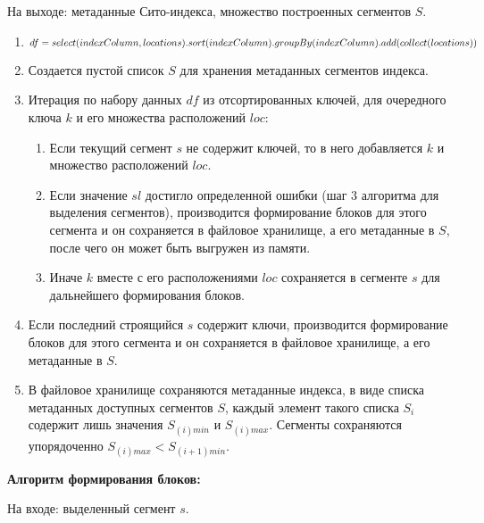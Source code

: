 На выходе: метаданные Сито-индекса, множество построенных сегментов $S$.
\begin{enumerate}
\item $df = select(indexColumn, locations).sort(indexColumn)\\.groupBy(indexColumn).add(collect(locations))$
\item Создается пустой список $S$ для хранения метаданных сегментов индекса.
\item Итерация по набору данных $df$ из отсортированных ключей, для очередного ключа $k$ и его множества расположений $loc$:
    \begin{enumerate}
    \item Если текущий сегмент $s$ не содержит ключей, то в него добавляется $k$ и множество расположений $loc$.
    \item Если значение $sl$ достигло определенной ошибки (шаг 3 алгоритма для выделения сегментов), производится формирование блоков для этого сегмента и он сохраняется в файловое хранилище, а его метаданные в $S$, после чего он может быть выгружен из памяти.
    \item Иначе $k$ вместе с его расположениями $loc$ сохраняется в сегменте $s$ для дальнейшего формирования блоков.
    \end{enumerate}
\item Если последний строящийся $s$ содержит ключи, производится формирование блоков для этого сегмента и он сохраняется в файловое хранилище, а его метаданные в $S$.
\item В файловое хранилище сохраняются метаданные индекса, в виде списка метаданных доступных сегментов $S$, каждый элемент такого списка $S_i$ содержит лишь значения $S_{(i)min}$ и $S_{(i)max}$. Сегменты сохраняются упорядоченно $S_{(i)max} < S_{(i+1)min}$.
\end{enumerate}

\textbf{Алгоритм формирования блоков:}

На входе: выделенный сегмент $s$.

